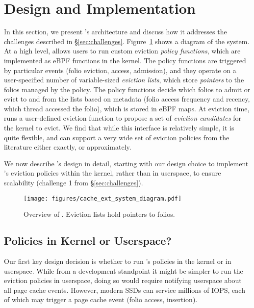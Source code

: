 \section{Design and Implementation}
\label{sec:design}

In this section, we present \name's architecture and discuss how it addresses the challenges described in \S\ref{sec:challenges}.
Figure~\ref{fig:system-diagram} shows a diagram of the system.
At a high level, \name allows users to run custom eviction \emph{policy functions}, which are implemented as eBPF functions in the kernel. The policy functions are triggered by particular events (\eg folio eviction, access, admission), and they operate on a user-specified number of variable-sized \emph{eviction lists}, which store \emph{pointers} to the folios managed by the policy. The policy functions decide which folios to admit or evict to and from the lists based on metadata (\eg folio access frequency and recency, which thread accessed the folio), which is stored in eBPF maps. At eviction time, \name runs a user-defined eviction function to propose a set of \emph{eviction candidates} for the kernel to evict.
We find that while this interface is relatively simple, it is quite flexible, and can support a very wide set of eviction policies from the literature either exactly, or approximately.

We now describe \name's design in detail, starting with our design choice to implement \name's eviction policies within the kernel, rather than in userspace, to ensure scalability (challenge 1 from \S\ref{sec:challenges}).


\begin{figure}[t!]
    \centering
    \texttt{[image: figures/cache\_ext\_system\_diagram.pdf]}
    \caption{Overview of \name. Eviction lists hold pointers to folios.}
    \label{fig:system-diagram}
\end{figure}

\subsection{Policies in Kernel or Userspace?}
\label{subsec:kernel-vs-userspace}

Our first key design decision is whether to run \name's policies in the kernel or in userspace.
While from a development standpoint it might be simpler to run the eviction policies in userspace, doing so would require notifying userspace about all page cache events. However, modern SSDs can service millions of IOPS, each of which may trigger a page cache event (\eg folio access, insertion). 

